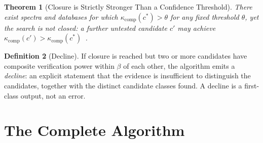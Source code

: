 \documentclass[twocolumn,10pt,a4paper]{article}
\theoremstyle{thmstyle}
\newtheorem{theorem}{Theorem}[section]
\theoremstyle{definition}
\newtheorem{definition}[theorem]{Definition}
\theoremstyle{remark}
\newcommand{\flo}{\beta}
\begin{document}
\begin{theorem}[Closure is Strictly Stronger Than a Confidence Threshold]
\label{thm:closure-stronger}
There exist spectra and databases for which
$\kappa_{\mathrm{comp}}(c^*) > \theta$ for any fixed threshold
$\theta$, yet the search is not closed: a further untested candidate
$c'$ may achieve $\kappa_{\mathrm{comp}}(c') > \kappa_{\mathrm{comp}}(c^*)$~\citep{sachikonye2024scp}.
\end{theorem}

\begin{definition}[Decline]
\label{def:decline}
If closure is reached but two or more candidates have composite
verification power within $\flo$ of each other, the algorithm emits a
\emph{decline}: an explicit statement that the evidence is insufficient
to distinguish the candidates, together with the distinct candidate
classes found. A decline is a first-class output, not an error.
\end{definition}


\section{The Complete Algorithm}
\label{sec:algorithm}
\end{document}
